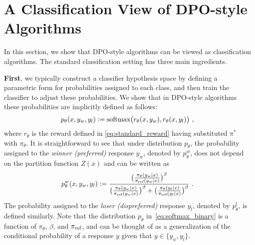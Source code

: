 \section{A Classification View of DPO-style Algorithms}
\label{sec:PO-C}

In this section, we show that DPO-style algorithms can be viewed as classification algorithms. The standard classification setting has three main ingredients.

\textbf{First}, we typically construct a classifier hypothesis space by defining a parametric form for probabilities assigned to each class, and then train the classifier to adjust these probabilities. We show that in DPO-style algorithms these probabilities are implicitly defined as follows:
%
\begin{equation}
p_{\theta}(x,y_w,y_l) \mathrel{\mathop:}= \textrm{softmax}\big(  r_{\theta}(x , y_w) , r_{\theta}(x , y_l)\big)\ ,
\label{eq:softmax_binary}
\end{equation}
%
where $r_{\theta}$ is the reward defined in \eqref{eq:standard_reward} having substituted $\pi^{*}$ with $\pi_{\theta}$. It is straightforward to see that under distribution $p_{\theta}$, the probability assigned to the {\em winner (preferred)} response $y_w$, denoted by $p^{ w}_{\theta}$, does not depend on the partition function $Z(x)$ and can be written as
%
\begin{equation} \label{pthetaw}
    p^{w}_{\theta}(x,y_w,y_l) := \frac{\big(\frac{\pi_{\theta}(y_w \mid x)}{\pi_{\textrm{ref}}(y_w \mid x)}\big)^{\beta}}{\big(\frac{\pi_{\theta}(y_{w} \mid x)}{\pi_{\textrm{ref}}(y_{w} \mid x)}\big)^{\beta} + \big(\frac{\pi_{\theta}(y_{l} \mid x)}{\pi_{\textrm{ref}}(y_{l} \mid x)}\big)^{\beta}} \ .
\end{equation}
%
The probability assigned to the {\em loser (dispreferred)} response $y_l$, denoted by $p^{l}_{\theta}$, is defined similarly. %
Note that the distribution $p_\theta$ in~\eqref{eq:softmax_binary} is a function of $\pi_\theta$, $\beta$, and $\pi_{\textrm{ref}}$, and can be thought of as a generalization of the conditional probability of a response $y$ given that $y \in \{y_w, y_l\}$.

